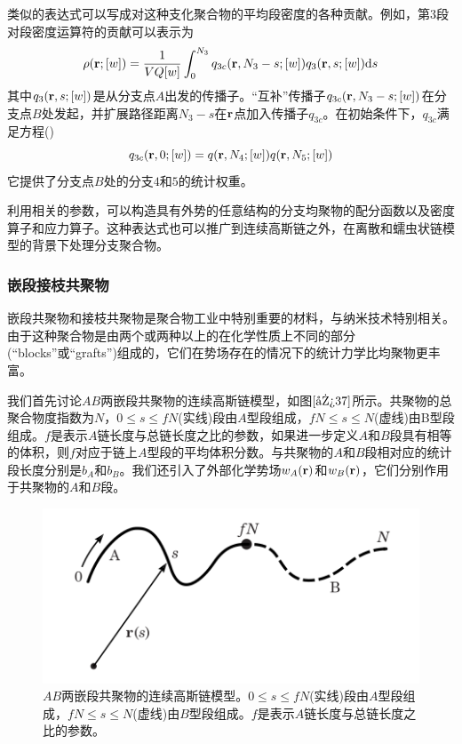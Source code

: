 类似的表达式可以写成对这种支化聚合物的平均段密度的各种贡献。例如，第$3$段对段密度运算符的贡献可以表示为
\begin{equation}
\rho(\mathbf{r};[w])=\frac{1}{VQ[w]}\int _{0}^{N_3} q_{3c}(\mathbf{r},N_3-s;[w])q_3(\mathbf{r},s;[w]) \mathrm{d}s
\end{equation}
其中$q_3(\mathbf{r},s;[w])$是从分支点$A$出发的传播子。“互补”传播子$q_{3c}(\mathbf{r},N_3-s;[w])$在分支点$B$处发起，并扩展路径距离$N_3-s$在$\mathbf{r}$点加入传播子$q_{3c}$。在初始条件下，$q_{3c}$满足方程(\label{传播子求导})
\begin{equation}
q_{3c}(\mathbf{r},0;[w])=q(\mathbf{r},N_4;[w])q(\mathbf{r},N_5;[w])
\end{equation}
它提供了分支点$B$处的分支$4$和$5$的统计权重。

利用相关的参数，可以构造具有外势的任意结构的分支均聚物的配分函数以及密度算子和应力算子。这种表达式也可以推广到连续高斯链之外，在离散和蠕虫状链模型的背景下处理分支聚合物。

\subsubsection{嵌段接枝共聚物}
嵌段共聚物和接枝共聚物是聚合物工业中特别重要的材料，与纳米技术特别相关。由于这种聚合物是由两个或两种以上的在化学性质上不同的部分(“blocks”或“grafts”)组成的，它们在势场存在的情况下的统计力学比均聚物更丰富。

我们首先讨论$AB$两嵌段共聚物的连续高斯链模型，如图$\ref{图37}$所示。共聚物的总聚合物度指数为$N$，$0\leq s \leq fN$(实线)段由$A$型段组成，$fN \leq s \leq N$(虚线)由B型段组成。$f$是表示$A$链长度与总链长度之比的参数，如果进一步定义$A$和$B$段具有相等的体积，则$f$对应于链上$A$型段的平均体积分数。与共聚物的$A$和$B$段相对应的统计段长度分别是$b_A$和$b_B$。我们还引入了外部化学势场$w_A(\mathbf{r})$和$w_B(\mathbf{r})$，它们分别作用于共聚物的$A$和$B$段。

\begin{figure}[H]
\centering
\includegraphics[scale=0.7]{./figures/37.png}
\caption{$AB$两嵌段共聚物的连续高斯链模型。$0\leq s \leq fN$(实线)段由$A$型段组成，$fN \leq s \leq N$(虚线)由$B$型段组成。$f$是表示$A$链长度与总链长度之比的参数。}
\label{图37}
\end{figure}

